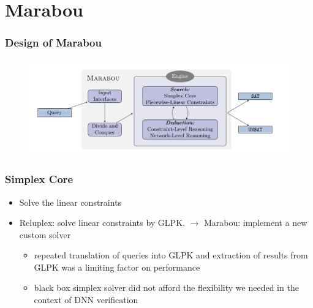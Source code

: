 \documentclass[aspectratio=169%
,serif,mathserif]{beamer}
\begin{document}
\section{Marabou}
\begin{frame}
	\frametitle{Design of Marabou}
	\begin{figure}[htbp]
		\includegraphics[width=1\linewidth]{1.png}
	\end{figure}
\end{frame}

\begin{frame}
	\frametitle{Simplex Core}
	\begin{itemize}
		\item Solve the linear constraints
		\item Reluplex: solve linear constraints by GLPK. $\to$ Marabou: implement a new custom solver 
			\begin{itemize}
				\item repeated translation of queries into GLPK and extraction of results from GLPK was a limiting factor on performance
				\item black box simplex solver did not afford the flexibility we needed in the context of DNN verification
			\end{itemize}		
	\end{itemize}	

\end{frame}
\end{document}
